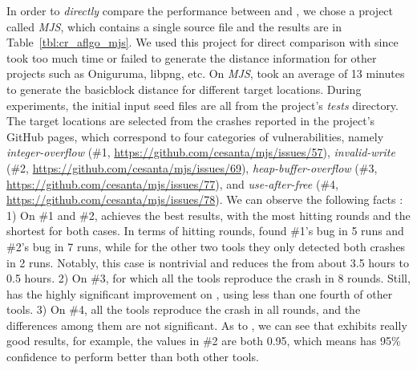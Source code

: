In order to \emph{directly} compare the performance between {\dFOT} and {\aflgo}, we chose a project called \emph{MJS}, which contains a single source file and the results are in Table~\ref{tbl:cr_aflgo_mjs}.
We used this project for direct comparison with \aflgo since \aflgo took too much time or failed to generate the distance information for other projects such as Oniguruma, libpng, etc. 
On \emph{MJS}, \aflgo took an average of 13 minutes to generate the basicblock distance for different target locations.
During experiments, the initial input seed files are all from the project's \emph{tests} directory. The target locations are selected from the crashes reported in the project's GitHub pages, which correspond to four categories of vulnerabilities, namely \emph{integer-overflow} (\#1, \url{https://github.com/cesanta/mjs/issues/57}), \emph{invalid-write} (\#2, \url{https://github.com/cesanta/mjs/issues/69}), \emph{heap-buffer-overflow} (\#3, \url{https://github.com/cesanta/mjs/issues/77}), and \emph{use-after-free} (\#4, \url{https://github.com/cesanta/mjs/issues/78}). We can observe the following facts : 
1) On \#1 and \#2,  \dFOT achieves the best results, with the most hitting rounds and the shortest {\utte} for both cases.  In terms of hitting rounds, {\dFOT} found \#1's bug in 5 runs and \#2's bug in 7 runs, while for the other two tools they only detected both crashes in 2 runs. Notably, this case is nontrivial and {\dFOT} reduces the {\utte} from about 3.5 hours to 0.5 hours.
2) On \#3, for which all the tools reproduce the crash in 8 rounds. Still, \dFOT has the highly significant improvement on {\utte}, using less than one fourth {\utte} of other tools.
3) On \#4, all the tools reproduce the crash in all rounds, and the {\utte} differences among them are not significant.
As to \alz, we can see that \dFOT exhibits really good results, for  example, the values in \#2 are both 0.95, which means \dFOT has 95\% confidence to perform better than both other tools.



